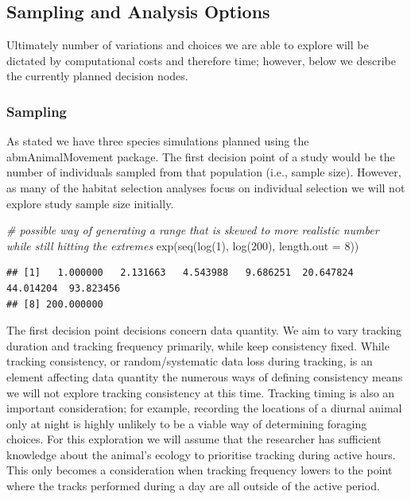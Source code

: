 \documentclass[10pt,a4paper]{article}
\newenvironment{Shaded}{}{}
\newcommand{\AttributeTok}[1]{#1}
\newcommand{\CommentTok}[1]{\textit{#1}}
\newcommand{\DecValTok}[1]{#1}
\newcommand{\FunctionTok}[1]{#1}
\newcommand{\NormalTok}[1]{#1}
\begin{document}
\hypertarget{sampling-and-analysis-options}{%
\subsection{Sampling and Analysis Options}\label{sampling-and-analysis-options}}

Ultimately number of variations and choices we are able to explore will be dictated by computational costs and therefore time; however, below we describe the currently planned decision nodes.

\hypertarget{sampling}{%
\subsubsection{Sampling}\label{sampling}}

As stated we have three species simulations planned using the abmAnimalMovement package.
The first decision point of a study would be the number of individuals sampled from that population (i.e., sample size).
However, as many of the habitat selection analyses focus on individual selection we will not explore study sample size initially.

\begin{Shaded}
\begin{Highlighting}[]
\CommentTok{\# possible way of generating a range that is skewed to more realistic number while still hitting the extremes}
\FunctionTok{exp}\NormalTok{(}\FunctionTok{seq}\NormalTok{(}\FunctionTok{log}\NormalTok{(}\DecValTok{1}\NormalTok{), }\FunctionTok{log}\NormalTok{(}\DecValTok{200}\NormalTok{), }\AttributeTok{length.out =} \DecValTok{8}\NormalTok{))}
\end{Highlighting}
\end{Shaded}

\begin{verbatim}
## [1]   1.000000   2.131663   4.543988   9.686251  20.647824  44.014204  93.823456
## [8] 200.000000
\end{verbatim}

The first decision point decisions concern data quantity.
We aim to vary tracking duration and tracking frequency primarily, while keep consistency fixed.
While tracking consistency, or random/systematic data loss during tracking, is an element affecting data quantity the numerous ways of defining consistency means we will not explore tracking consistency at this time.
Tracking timing is also an important consideration; for example, recording the locations of a diurnal animal only at night is highly unlikely to be a viable way of determining foraging choices.
For this exploration we will assume that the researcher has sufficient knowledge about the animal's ecology to prioritise tracking during active hours.
This only becomes a consideration when tracking frequency lowers to the point where the tracks performed during a day are all outside of the active period.
\end{document}
